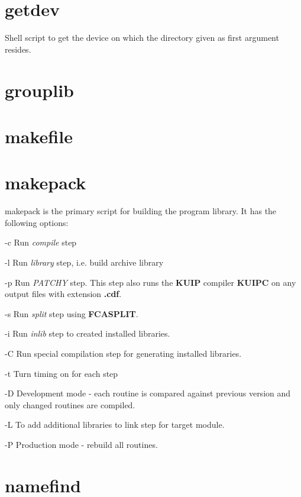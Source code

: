 \section{getdev}

Shell script to get the device on which the directory
given as first argument resides.

\section{grouplib}

\section{makefile}

\section{makepack}

makepack is the primary script for building the program library. It has
the following options:

\begin{DLtt}{12}
\item[-c]Run {\it compile} step
\item[-l]Run {\it library} step, i.e. build archive library
\item[-p]Run {\it PATCHY} step. This step also runs the {\bf KUIP}
compiler {\bf KUIPC} on any output files with extension {\bf .cdf}.
\item[-s]Run {\it split} step using {\bf FCASPLIT}.
\item[-i]Run {\it inlib} step to created installed libraries.
\item[-C]Run special compilation step for generating installed libraries.
\item[-t]Turn timing on for each step
\item[-D]Development mode - each routine is compared against previous
version and only changed routines are compiled.
\item[-L]To add additional libraries to link step for target module.
\item[-P]Production mode - rebuild all routines.
\end{DLtt}

\section{namefind}

